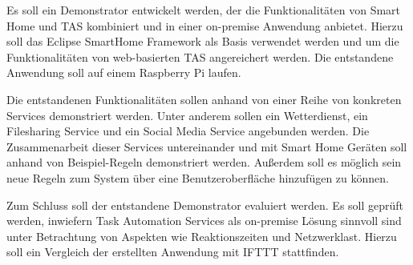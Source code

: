 \documentclass[12pt]{article}
\begin{document}
Es soll ein Demonstrator entwickelt werden, der die Funktionalitäten von Smart Home und TAS kombiniert und in einer on-premise Anwendung anbietet. Hierzu soll das Eclipse SmartHome Framework als Basis verwendet werden und um die Funktionalitäten von web-basierten TAS angereichert werden. Die entstandene Anwendung soll auf einem Raspberry Pi laufen.

Die entstandenen Funktionalitäten sollen anhand von einer Reihe von konkreten Services demonstriert werden. Unter anderem sollen ein Wetterdienst, ein Filesharing Service und ein Social Media Service angebunden werden. Die Zusammenarbeit dieser Services untereinander und mit Smart Home Geräten soll anhand von Beispiel-Regeln demonstriert werden. Außerdem soll es möglich sein neue Regeln zum System über eine Benutzeroberfläche hinzufügen zu können.

Zum Schluss soll der entstandene Demonstrator evaluiert werden. Es soll geprüft werden, inwiefern Task Automation Services als on-premise Lösung sinnvoll sind unter Betrachtung von Aspekten wie Reaktionszeiten und Netzwerklast. Hierzu soll ein Vergleich der erstellten Anwendung mit IFTTT stattfinden.




\end{document}
